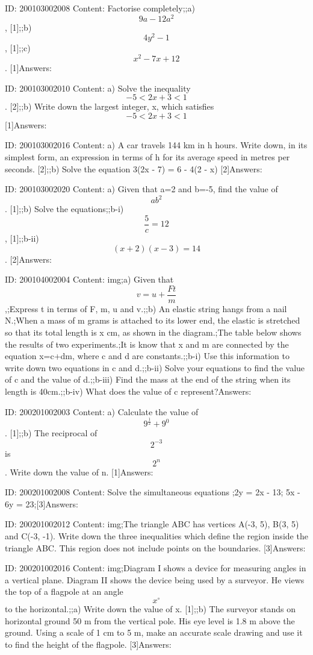 \documentclass{article}
\begin{document}
ID: 200103002008
Content:
Factorise completely;;a) $$9a - 12a^2$$,    [1];;b) $$4y^2 - 1$$,    [1];;c) $$x^2 - 7x + 12$$.    [1]Answers:

ID: 200103002010
Content:
a) Solve the inequality $$-5 < 2x +3 < 1$$. [2];;b) Write down the largest integer, x, which satisfies $$-5 < 2x + 3 < 1$$ [1]Answers:

ID: 200103002016
Content:
a) A car travels 144 km in h hours. Write down, in its simplest form, an expression in terms of h for its average speed in metres per seconds.    [2];;b) Solve the equation 3(2x - 7) = 6 - 4(2 - x) [2]Answers:

ID: 200103002020
Content:
a) Given that a=2 and b=-5, find the value of $$ab^2$$.    [1];;b) Solve the equations;;b-i) $$\frac{5}{c} = 12$$,    [1];;b-ii) $$(x + 2)(x - 3) = 14$$.    [2]Answers:

ID: 200104002004
Content:
img;a) Given that $$v = u + \frac{Ft}{m}$$,;Express t in terms of F, m, u and v.;;b) An elastic string hangs from a nail N.;When a mass of m grams is attached to its lower end, the elastic is stretched so that its total length is x cm, as shown in the diagram.;The table below shows the results of two experiments.;It is know that x and m are connected by the equation x=c+dm, where c and d are constants.;;b-i) Use this information to write down two equations in c and d.;;b-ii) Solve your equations to find the value of c and the value of d.;;b-iii) Find the mass at the end of the string when its length is 40cm.;;b-iv) What does the value of c represent?Answers:

ID: 200201002003
Content:
a) Calculate the value of $$9^{\frac{1}{2}}+9^{0} $$. [1];;b) The reciprocal of $$2^{-3} $$ is $$2^{n}$$. Write down the value of n. [1]Answers:

ID: 200201002008
Content:
Solve the simultaneous equations ;2y = 2x - 13; 5x - 6y = 23;[3]Answers:

ID: 200201002012
Content:
img;The triangle ABC has vertices A(-3, 5), B(3, 5) and C(-3, -1). Write down the three inequalities which define the region inside the triangle ABC. This region does not include points on the boundaries. [3]Answers:

ID: 200201002016
Content:
img;Diagram I shows a device for measuring angles in a vertical plane. Diagram II shows the device being used by a surveyor. He views the top of a flagpole at an angle $$x^{\circ}$$ to the horizontal.;;a) Write down the value of x. [1];;b) The surveyor stands on horizontal ground 50 m from the vertical pole. His eye level is 1.8 m above the ground. Using a scale of 1 cm to 5 m, make an accurate scale drawing and use it to find the height of the flagpole. [3]Answers:
\end{document}
